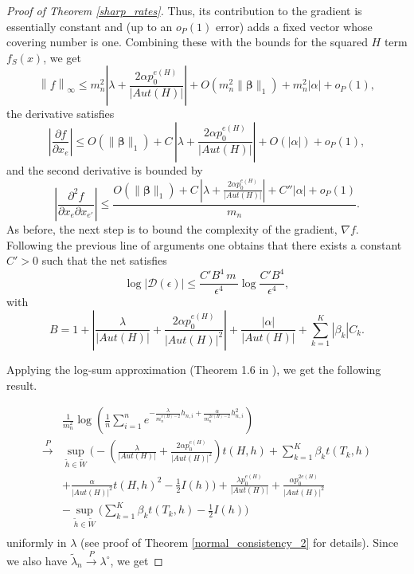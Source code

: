\documentclass[12pt]{article}
\numberwithin{equation}{section}
\def\bbeta{\boldsymbol{\beta}}
\begin{document}
\begin{proof}[Proof of Theorem \ref{sharp_rates}]
Thus, its contribution to the gradient is essentially constant and (up to an \(o_P(1)\) error) adds a fixed vector whose covering number is one.
Combining these with the bounds for the squared \(H\) term \(f_S(x)\), we get
\[
\left\|f\right\|_\infty \le  m_n^2|\lambda+\frac{2\alpha p_0^{e(H)}}{\lvert Aut(H)\rvert}| + O(m_n^2\|\bbeta\|_1) + m_n^2|\alpha|+ o_P(1),
\]
the derivative satisfies
\[
\left|\frac{\partial f}{\partial x_e}\right| \le O(\|\bbeta\|_1) + C\,|\lambda + \frac{2\alpha p_0^{e(H)}}{\lvert Aut(H)\rvert}| + O(|\alpha|) + o_P(1),
\]
and the second derivative is bounded by
\[
\left|\frac{\partial^2 f}{\partial x_e\partial x_{e'}}\right| \le \frac{O(\|\bbeta\|_1)+C\,|\lambda + \frac{2\alpha p_0^{e(H)}}{\lvert Aut(H)\rvert}|+C''|\alpha|+ o_P(1)}{m_n} .
\]
As before, the next step is to bound the complexity of the gradient, $\nabla f$.  Following the previous line of arguments one obtains that there exists a constant \(C'>0\) such that the net satisfies
\[
\log |\mathcal{D}(\epsilon)| \le \frac{C'B^4\,m\,}{\epsilon^4}\log\frac{C'B^4}{\epsilon^4},
\]
with
\[
B=1+|\frac{\lambda}{\lvert Aut(H)\rvert}+\frac{2\alpha p_0^{e(H)}}{\lvert Aut(H)\rvert^2}|+\frac{|\alpha|}{\lvert Aut(H)\rvert}+\sum_{k=1}^K |\beta_k| C_k.
\]

Applying the log-sum approximation  (Theorem 1.6 in \cite{chatterjee2016nonlinear}), we get the following result.

\begin{align*}&\frac{1}{m_n^2}\log\left(\frac{1}{n}\sum_{i=1}^n e^{-\frac{\lambda}{m_n^{v(H)-2}} h_{n,i} + \frac{\alpha}{m_n^{2v(H)-2}}h_{n,i}^2}\right)\\
\xrightarrow{P}&\sup_{\tilde{h}\in\tilde{W}}\bigg(-\left(\frac{\lambda}{|Aut(H)|}+\frac{2\alpha p_0^{e(H)}}{|Aut(H)|^2}\right) t(H,h) + \sum_{k=1}^K \beta_k t(T_k, h) \\
     &+ \frac{\alpha}{|Aut(H)|^2} t(H,h)^2 - \frac{1}{2} I(h)\bigg) + \frac{\lambda p_0^{e(H)}}{\lvert Aut(H)\rvert} + \frac{\alpha p_0^{2e(H)}}{\lvert Aut(H)\rvert^2} \\&- \sup_{\tilde{h}\in\tilde{W}}\bigg( \sum_{k=1}^K \beta_k t(T_k, h) 
      - \frac{1}{2} I(h)\bigg)\\
\end{align*}
uniformly in \(\lambda\) (see proof of Theorem \ref{normal_consistency_2} for details). Since we also have \(\tilde{\lambda}_n\xrightarrow{P} \lambda^{\circ}\), we get


\end{proof}
\end{document}
